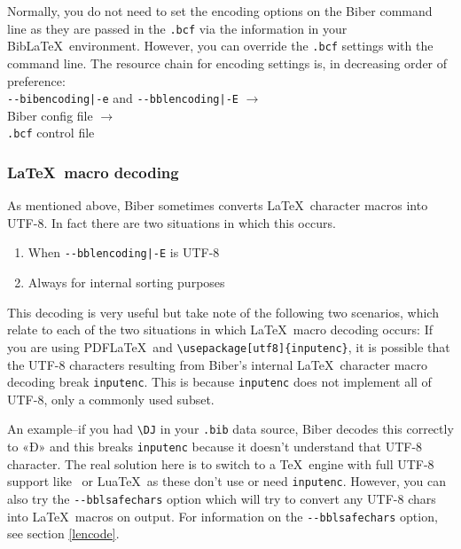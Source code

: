 \documentclass{ltxdockit}
\begin{document}
\noindent Normally, you do not need to set the encoding options on the
Biber command line as they are passed in the \verb+.bcf+ via the
information in your Bib\LaTeX\ environment. However, you can override
the \verb+.bcf+ settings with the command line. The resource chain for
encoding settings is, in decreasing order
of preference:\\[2ex]

\noindent\verb+--bibencoding|-e+ and \verb+--bblencoding|-E+ $\rightarrow$\\
\hspace*{1em}Biber config file $\rightarrow$\\
\hspace*{2em}\verb+.bcf+ control file

\subsubsection{\LaTeX\ macro decoding}\label{ldecode}

\noindent As mentioned above, Biber sometimes converts \LaTeX\
character macros into UTF-8. In fact there are two situations in which
this occurs.

\begin{enumerate}
\item When \verb+--bblencoding|-E+ is UTF-8
\item Always for internal sorting purposes
\end{enumerate}

\noindent This decoding is very useful but take note of the following
two scenarios, which relate to each of the two situations in which
\LaTeX\ macro decoding occurs:
\bigskip
{}
If you are using PDF\LaTeX\ and \verb+\usepackage[utf8]{inputenc}+, it
is possible that the UTF-8 characters resulting from Biber's
internal \LaTeX\ character macro decoding break \verb+inputenc+. This is
because \verb+inputenc+ does not implement all of UTF-8, only a
commonly used subset.

An example--if you had \verb+\DJ+ in your \verb+.bib+ data source,
Biber decodes this correctly to «Đ» and this breaks \verb+inputenc+
because it doesn't understand that UTF-8 character. The real solution here
is to switch to a \TeX\ engine with full UTF-8 support like \XeTeX\ or Lua\TeX\
as these don't use or need \verb+inputenc+. However, you can also try the
\verb+--bblsafechars+ option which will try to convert any UTF-8 chars into
\LaTeX\ macros on output. For information on the \verb+--bblsafechars+
option, see section \ref{lencode}.
\bigskip
{}
\end{document}
